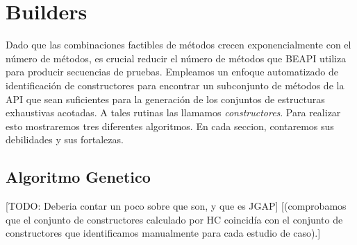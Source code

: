 \section{Builders}
Dado que las combinaciones factibles de métodos crecen exponencialmente con el número de métodos, es crucial reducir el número de métodos que \textsf{BEAPI} utiliza para producir secuencias de pruebas. Empleamos un enfoque automatizado de identificación de constructores \cite{Ponzio19} para encontrar un subconjunto de métodos de la API que sean suficientes para la generación de los conjuntos de estructuras exhaustivas acotadas. A tales rutinas las llamamos \emph{constructores}. 
Para realizar esto mostraremos tres diferentes algoritmos. En cada seccion, contaremos sus debilidades y sus fortalezas.

\subsection{Algoritmo Genetico}

[TODO: Deberia contar un poco sobre que son, y que es JGAP]
[(comprobamos que el conjunto de constructores calculado por HC coincidía con el conjunto de constructores que identificamos manualmente para cada estudio de caso).]

